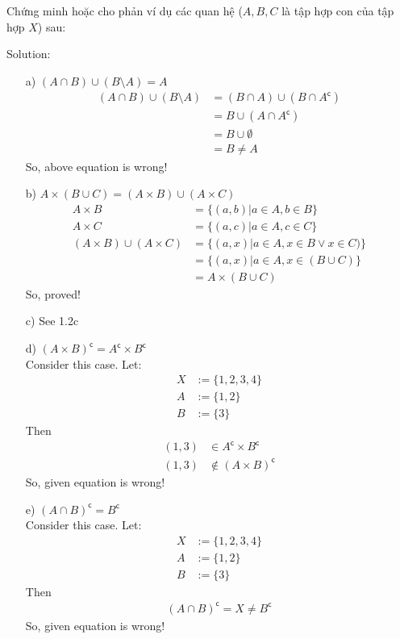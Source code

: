 \newpage
\begin{longfbox}
      \begin{bt} \label{pro:practice1.3}
            Chứng minh hoặc cho phản ví dụ các quan hệ ($A,B,C$ là tập hợp con của tập hợp $X$) sau:
      \end{bt}
\end{longfbox}
  
Solution:
\begin{enumerate}
\item[a)] $(A\cap B)\cup(B\setminus A) = A$ \\
      \begin{align}
            (A\cap B)\cup(B\setminus A) &= (B\cap A)\cup(B\cap A^\mathsf{c}) \\
            &= B\cup(A\cap A^\mathsf{c}) \\
            &= B\cup\emptyset \\
            &= B \neq A
      \end{align} 
      So, above equation is wrong!
\item[b)] $A\times (B\cup C) = (A\times B)\cup(A\times C)$ \\
      \begin{align}
            A\times B &= \{(a, b)| a\in A, b\in B\} \\
            A\times C &= \{(a, c)| a\in A, c\in C\} \\
            (A\times B)\cup(A\times C) &= \{(a, x)| a\in A, x\in B \lor x \in C)\} \\
            &= \{(a, x)| a\in A, x\in (B\cup C)\} \\
            &= A\times (B\cup C)
      \end{align} 
      So, proved!
\item[c)] See 1.2c
\item[d)] $(A\times B)^\mathsf{c} = A^\mathsf{c}\times B^\mathsf{c}$ \\
      Consider this case. Let:
      \begin{align}
            X &:=\{1,2,3,4\} \\
            A &:=\{1,2\} \\
            B &:=\{3\}
      \end{align}
      Then 
      \begin{align}
            (1,3) &\in A^\mathsf{c}\times B^\mathsf{c} \\
            (1,3) &\notin (A\times B)^\mathsf{c}
      \end{align}
      So, given equation is wrong!
\item[e)] $(A\cap B)^\mathsf{c} = B^\mathsf{c}$ \\
      Consider this case. Let:
      \begin{align}
            X &:=\{1,2,3,4\} \\
            A &:=\{1,2\} \\
            B &:=\{3\}
      \end{align}
      Then 
      \begin{align}
            (A\cap B)^\mathsf{c} = X \neq B^\mathsf{c}
      \end{align}
      So, given equation is wrong!
\end{enumerate}